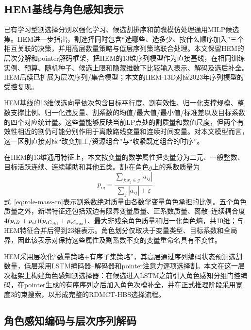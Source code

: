 \documentclass[journal]{IEEEtran}
\begin{document}
\subsection{HEM基线与角色感知表示}

已有学习型割选择分别以强化学习、候选割排序和前瞻模仿处理通用MILP候选集\cite{tang2020cut,huang2022cutranking,paulus2022looking}。HEM进一步指出，割选择同时包含“选哪些、选多少、按什么顺序加入”三个相互关联的决策，并用高层数量策略与低层序列策略联合处理\cite{wang2023hem}。本文保留HEM的层次分解和pointer解码框架，把HEM的13维序列模型作为直接基线，在相同训练实例、预算、随机种子、候选上限和隐藏维数下比较输入表示、解码及选后补全。HEM后续已扩展为层次序列/集合模型\cite{wang2024hemset}；本文的HEM-13D对应2023年序列模型的受控复现。

HEM基线的13维候选向量依次包含目标平行度、割有效性、归一化支撑规模、整数支撑比例、归一化违反量、割系数的均值/最大值/最小值/标准差以及目标系数的四个对应统计量。这些量能够反映当前LP点处的割质量和数值尺度，但两个有效性相近的割仍可能分别作用于离散路线变量和连续时间变量。对本文模型而言，这一区别直接对应“改变加工/资源组合”与“收紧既定组合的时序”。

在HEM的13维通用特征上，本文按变量的数学属性把变量分为二元、一般整数、目标活跃连续、连续辅助和其他五类。割$i$在角色$g$上的系数质量为
\begin{equation}
p_{ig}=\frac{\sum_{j:x_j\in g}|a_{ij}|}{\sum_j|a_{ij}|+\varepsilon}.
\label{eq:role-mass-cn}
\end{equation}
式~\eqref{eq:role-mass-cn}表示割系数绝对质量由各数学变量角色承担的比例。五个角色质量之外，新增特征还包括双边有限界变量质量、正系数质量、离散--连续耦合度$4(p_{iB}+p_{iI})(p_{iC_{\rm obj}}+p_{iC_{\rm aux}})$、最大非残余角色质量和归一化角色熵，共10维；与HEM特征合并后得到23维表示。角色划分仅取决于变量类型、目标系数和全局界，因此该表示对保持这些属性及割系数不变的变量重命名具有不变性。

HEM采用层次化“数量策略+有序子集策略”，其高层通过序列编码状态预测选割数量，低层采用LSTM编码器--解码器和pointer注意力逐项选择割\cite{wang2023hem,vinyals2015pointer}。本文在这一层次框架上构建角色感知割选择器：在候选进入LSTM之前引入角色感知分组门控编码，在pointer生成的有序序列之后加入角色次模补全，并在正式推理阶段采用宽度3的束搜索，以形成完整的RDMCT-HBS选择流程。


\subsection{角色感知编码与层次序列解码}
\end{document}
